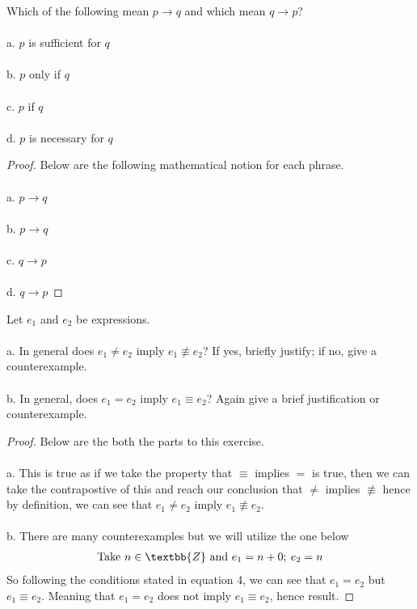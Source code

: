 \documentclass[12pt]{article}
\newenvironment{exercise}[2][Exercise]{\begin{trivlist}
\item[\hskip \labelsep {\bfseries #1}\hskip \labelsep {\bfseries #2.}]}{\end{trivlist}}
\begin{document}
\begin{exercise}{5}
Which of the following mean $p \rightarrow q$ and which mean $q \rightarrow p$? \\ \\
a. $p$ is sufficient for $q$ \\ \\
b. $p$ only if $q$ \\ \\
c. $p$ if $q$ \\ \\
d. $p$ is necessary for $q$
\end{exercise}

\begin{proof} 
Below are the following mathematical notion for each phrase. \\ \\
a. $p \rightarrow q$ \\ \\
b. $p \rightarrow q$ \\ \\
c. $q \rightarrow p$ \\ \\
d. $q \rightarrow p$ 

\end{proof}

\begin{exercise}{6}
Let $e_{1}$ and $e_{2}$ be expressions. \\ \\
a. In general does $e_{1} \neq e_{2}$ imply $e_{1} \not\equiv e_{2}$? If yes, briefly justify; if no, give a counterexample. \\ \\
b. In general, does $e_{1} = e_{2}$ imply $e_{1} \equiv e_{2}$? Again give a brief justification or counterexample.
\end{exercise}

\begin{proof}
Below are the both the parts to this exercise. \\ \\
a. This is true as if we take the property that $\equiv$ implies $=$ is true, then we can take the contrapostive of this and reach our conclusion that $\neq$ implies $\not\equiv$ hence by definition, we can see that $e_{1} \neq e_{2}$ imply $e_{1} \not\equiv e_{2}$. \\ \\
b. There are many counterexamples but we will utilize the one below
\begin{align}
    \text{Take } n \in \textbb{Z} \text{ and } e_{1} = n + 0;\: e_{2} = n
\end{align}
So following the conditions stated in equation 4, we can see that $e_{1} = e_{2}$ but $e_{1} \equiv e_{2}$. Meaning that $e_{1} = e_{2}$ does not imply $e_{1} \equiv e_{2}$, hence result.

\end{proof}
\end{document}
